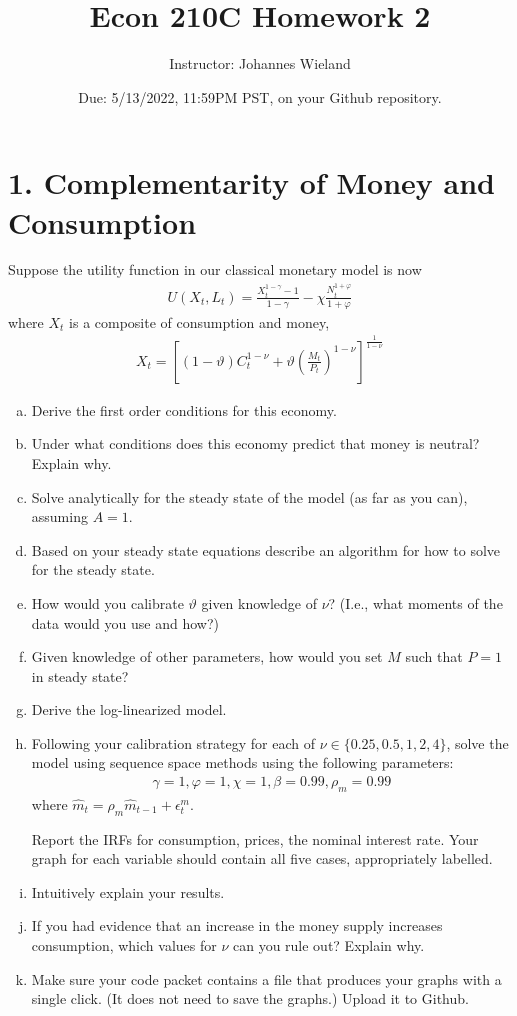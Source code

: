 \documentclass{article}
\newcommand{\1}{\mathbf{1}}
\begin{document}
\title{Econ 210C Homework 2}
\author{Instructor: Johannes Wieland}
\date{\color{red} Due: 5/13/2022, 11:59PM PST, on your Github repository.}
\maketitle




\section*{1. Complementarity of Money and Consumption}
Suppose the utility function in our classical monetary model is now
\begin{align*}
	U(X_t,L_t)=\frac{X_t^{1-\gamma}-1}{1-\gamma}-\chi \frac{N_t^{1+\varphi}}{{1+\varphi}}
\end{align*}
where $X_t$ is a composite of consumption and money,
\begin{align*}
	X_t=\left[(1-\vartheta)C_t^{1-\nu}+\vartheta\left(\frac{M_t}{P_t}\right)^{1-\nu}\right]^{\frac{1}{1-\nu}}
\end{align*}
\begin{enumerate}[(a)]
	\item Derive the first order conditions for this economy.
	\item Under what conditions does this economy predict that money is neutral? Explain why.
	\item Solve analytically for the steady state of the model (as far as you can), assuming $A=1$.
	\item Based on your steady state equations describe an algorithm for how to solve for the steady state.
	\item How would you calibrate $\vartheta$ given knowledge of $\nu$? (I.e., what moments of the data would you use and how?)
	\item Given knowledge of other parameters, how would you set $M$ such that $P=1$ in steady state?
	\item Derive the log-linearized model. 
	\item Following your calibration strategy for each of $\nu\in\{0.25,0.5,1,2,4\}$, solve the model using sequence space methods using the following parameters:
	\begin{align*} \gamma=1,\varphi=1,\chi=1,\beta=0.99,\rho_m=0.99
	\end{align*}
	where $\hat{m}_t = \rho_m \hat{m}_{t-1} + \epsilon_t^m$.
	
	Report the IRFs for consumption, prices, the nominal interest rate. Your graph for each variable should contain all five cases, appropriately labelled. 
	\item Intuitively explain your results.
	\item If you had evidence that an increase in the money supply increases consumption, which values for $\nu$ can you rule out? Explain why.
	\item Make sure your code packet contains a file that produces your graphs with a single click. (It does not need to save the graphs.) Upload it to Github.
\end{enumerate}
\end{document}
